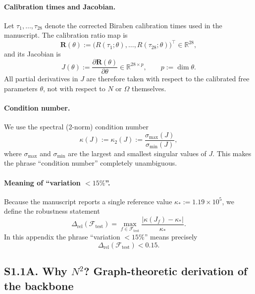 \documentclass[11pt]{article}
\begin{document}
\paragraph{Calibration times and Jacobian.}
Let \(\tau_1,\dots,\tau_{28}\) denote the corrected Biraben calibration times used in the manuscript.
The calibration ratio map is
\begin{equation}
\mathbf R(\theta):=
\bigl(R(\tau_1;\theta),\dots,R(\tau_{28};\theta)\bigr)^{\!\top}\in\mathbb{R}^{28},
\label{eq:S1_ratio_map}
\end{equation}
and its Jacobian is
\begin{equation}
J(\theta):=
\frac{\partial \mathbf R(\theta)}{\partial \theta}
\in\mathbb{R}^{28\times p},
\qquad p:=\dim\theta .
\label{eq:S1_Jacobian}
\end{equation}
All partial derivatives in \(J\) are therefore taken with respect to the calibrated free parameters
\(\theta\), not with respect to \(N\) or \(\Omega\) themselves.

\paragraph{Condition number.}
We use the spectral (2-norm) condition number
\begin{equation}
\kappa(J):=\kappa_2(J):=
\frac{\sigma_{\max}(J)}{\sigma_{\min}(J)},
\label{eq:S1_kappa}
\end{equation}
where \(\sigma_{\max}\) and \(\sigma_{\min}\) are the largest and smallest singular values of \(J\).
This makes the phrase ``condition number'' completely unambiguous.

\paragraph{Meaning of ``variation \(<15\%\)''.}
Because the manuscript reports a single reference value \(\kappa_*:=1.19\times 10^5\),
we define the robustness statement
\begin{equation}
\Delta_{\mathrm{rel}}(\mathcal F_{\mathrm{test}})=
\max_{f\in \mathcal F_{\mathrm{test}}}
\frac{|\kappa(J_f)-\kappa_*|}{\kappa_*}.
\label{eq:S1_relvar}
\end{equation}
In this appendix the phrase ``variation \(<15\%\)'' means precisely
\begin{equation}
\Delta_{\mathrm{rel}}(\mathcal F_{\mathrm{test}})<0.15.
\label{eq:S1_var15}
\end{equation}

\subsection*{S1.1A. Why $N^2$? Graph-theoretic derivation of the backbone}
\end{document}
